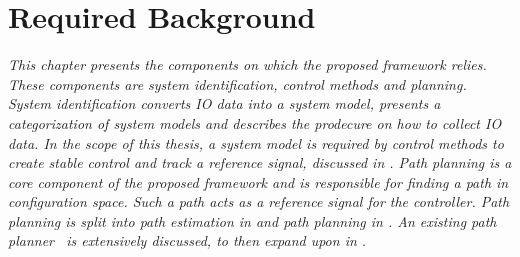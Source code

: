 \chapter{Required Background}%
\label{chap:required_background}
\textit{This chapter presents the components on which the proposed framework relies. These components are system identification, control methods and planning. System identification converts \ac{IO} data into a system model,  presents a categorization of system models and describes the prodecure on how to collect \ac{IO} data. In the scope of this thesis, a system model is required by control methods to create stable control and track a reference signal, discussed in . Path planning is a core component of the proposed framework and is responsible for finding a path in configuration space. Such a path acts as a reference signal for the controller. Path planning is split into path estimation in  and path planning in . An existing path planner~\cite{wang_affordancebased_2020} is extensively discussed, to then expand upon in .\bs}

% 



